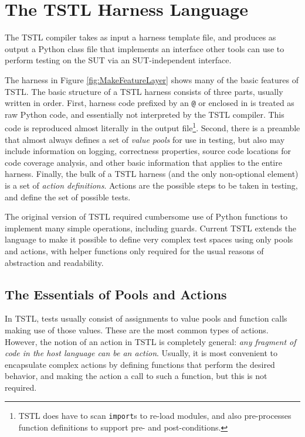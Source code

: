 \section{The TSTL Harness Language}
\label{sec:lang}

The TSTL compiler takes as input a harness template file, and produces
as output a Python class file that implements an interface other tools
can use to perform testing on the SUT via an SUT-independent interface.

The harness in Figure \ref{fig:MakeFeatureLayer} shows many of the
basic features of TSTL.  The basic structure of a TSTL harness
consists of three parts, usually written in order.  First, harness
code prefixed by an {\tt @} or enclosed in {\tt <@ @>} is treated as
raw Python code, and essentially not interpreted by the TSTL
compiler.  This code is reproduced almost literally in the output
file\footnote{TSTL does have to scan {\tt import}s to re-load modules, and also pre-processes function
  definitions to support
pre- and post-conditions.}.  Second, there is a preamble that almost
always defines a set of \emph{value pools} for use in testing, but
also may include information on logging, correctness properties,
source code locations for code coverage analysis, and other basic
information that applies to the entire harness.  Finally, the bulk of
a TSTL harness (and the only non-optional element) is a set of
\emph{action definitions}.  Actions are the possible steps to be taken in
testing, and define the set of possible tests.

The original version of TSTL \cite{NFM15} required cumbersome use of Python
functions to implement many simple operations, including guards.  Current TSTL extends
the language to make it possible to define very complex test spaces
using only pools and actions, with helper functions only required for
the usual reasons of abstraction and readability.

\subsection{The Essentials of Pools and Actions}

In TSTL, tests usually consist of assignments to value pools and
function calls making use of those values.  These are the most common
types of actions.  However, the notion of an action in TSTL is
completely general:  \emph{any fragment of code in the host language can be
an action}.  Usually, it is most convenient to encapsulate complex
actions by defining functions that perform the desired behavior, and
making the action a call to such a function, but this is not required.

